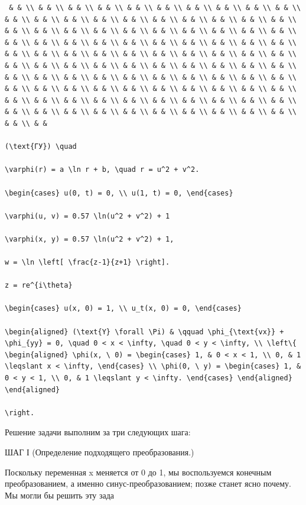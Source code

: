 \documentclass[
  ukrainian,
]{article}
\begin{document}
\begin{verbatim}
 & & \\ & & \\ & & \\ & & \\ & & \\ & & \\ & & \\ & & \\ & & \\ & & \\ & & \\ & & \\ & & \\ & & \\ & & \\ & & \\ & & \\ & & \\ & & \\ & & \\ & & \\ & & \\ & & \\ & & \\ & & \\ & & \\ & & \\ & & \\ & & \\ & & \\ & & \\ & & \\ & & \\ & & \\ & & \\ & & \\ & & \\ & & \\ & & \\ & & \\ & & \\ & & \\ & & \\ & & \\ & & \\ & & \\ & & \\ & & \\ & & \\ & & \\ & & \\ & & \\ & & \\ & & \\ & & \\ & & \\ & & \\ & & \\ & & \\ & & \\ & & \\ & & \\ & & \\ & & \\ & & \\ & & \\ & & \\ & & \\ & & \\ & & \\ & & \\ & & \\ & & \\ & & \\ & & \\ & & \\ & & \\ & & \\ & & \\ & & \\ & & \\ & & \\ & & \\ & & \\ & & \\ & & \\ & & \\ & & \\ & & \\ & & \\ & & \\ & & \\ & & \\ & & \\ & & \\ & & \\ & & \\ & & \\ & & \\ & & \\ & & \\ & &

(\text{ГУ}) \quad

\varphi(r) = a \ln r + b, \quad r = u^2 + v^2.

\begin{cases} u(0, t) = 0, \\ u(1, t) = 0, \end{cases}

\varphi(u, v) = 0.57 \ln(u^2 + v^2) + 1

\varphi(x, y) = 0.57 \ln(u^2 + v^2) + 1,

w = \ln \left[ \frac{z-1}{z+1} \right].

z = re^{i\theta}

\begin{cases} u(x, 0) = 1, \\ u_t(x, 0) = 0, \end{cases}

\begin{aligned} (\text{Y} \forall \Pi) & \qquad \phi_{\text{vx}} + \phi_{yy} = 0, \quad 0 < x < \infty, \quad 0 < y < \infty, \\ \left\{ \begin{aligned} \phi(x, \ 0) = \begin{cases} 1, & 0 < x < 1, \\ 0, & 1 \leqslant x < \infty, \end{cases} \\ \phi(0, \ y) = \begin{cases} 1, & 0 < y < 1, \\ 0, & 1 \leqslant y < \infty. \end{cases} \end{aligned} \end{aligned}

\right.
\end{verbatim}

Решение задачи выполним за три следующих шага:

ШАГ І (Определение подходящего преобразования.)

Поскольку переменная x меняется от 0 до 1, мы воспользуемся конечным
преобразованием, а именно синус-преобразованием; позже станет ясно
почему. Мы могли бы решить эту зада
\end{document}
